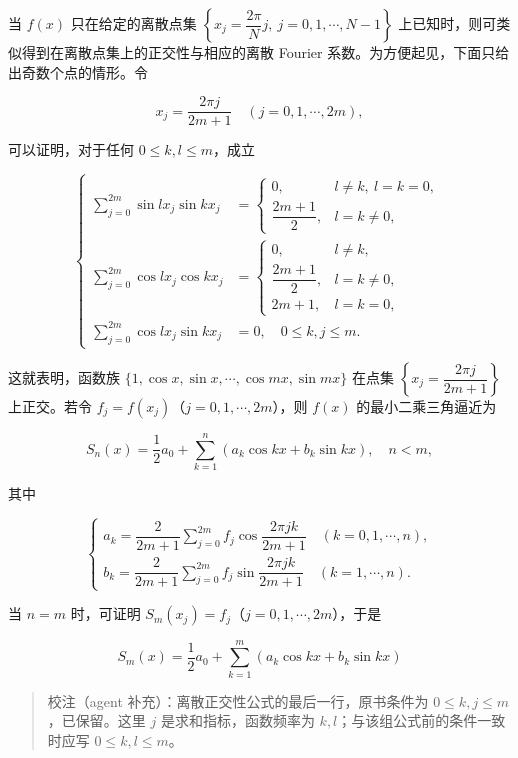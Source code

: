 \documentclass[
  10pt,
  fontset=fandol]{ctexart}
\begin{document}
当 \(f(x)\) 只在给定的离散点集 \(\left\{x_j=\dfrac{2\pi}{N}j,\ j=0,1,\cdots,N-1\right\}\) 上已知时，则可类似得到在离散点集上的正交性与相应的离散 Fourier 系数。为方便起见，下面只给出奇数个点的情形。令

\[
x_j=\frac{2\pi j}{2m+1}\quad(j=0,1,\cdots,2m),
\]

可以证明，对于任何 \(0\leqslant k,l\leqslant m\)，成立

\[
\left\{\begin{aligned}
\sum_{j=0}^{2m}\sin lx_j\sin kx_j&=\begin{cases}
0,&l\ne k,\ l=k=0,\\
\dfrac{2m+1}{2},&l=k\ne0,
\end{cases}\\[4pt]
\sum_{j=0}^{2m}\cos lx_j\cos kx_j&=\begin{cases}
0,&l\ne k,\\
\dfrac{2m+1}{2},&l=k\ne0,\\
2m+1,&l=k=0,
\end{cases}\\[4pt]
\sum_{j=0}^{2m}\cos lx_j\sin kx_j&=0,\quad0\leqslant k,j\leqslant m.
\end{aligned}\right.
\]

这就表明，函数族 \(\{1,\allowbreak \cos x,\allowbreak \sin x,\allowbreak \cdots,\allowbreak \cos mx,\allowbreak \sin mx\}\) 在点集 \(\left\{x_j=\dfrac{2\pi j}{2m+1}\right\}\) 上正交。若令 \(f_j=f(x_j)\)（\(j=0,1,\cdots,2m\)），则 \(f(x)\) 的最小二乘三角逼近为

\[
S_n(x)=\frac12a_0+\sum_{k=1}^n(a_k\cos kx+b_k\sin kx),\quad n<m,
\]

其中

\[
\begin{cases}
a_k=\dfrac2{2m+1}\displaystyle\sum_{j=0}^{2m}f_j\cos\dfrac{2\pi jk}{2m+1}\quad(k=0,1,\cdots,n),\\[4pt]
b_k=\dfrac2{2m+1}\displaystyle\sum_{j=0}^{2m}f_j\sin\dfrac{2\pi jk}{2m+1}\quad(k=1,\cdots,n).
\end{cases}\tag{3.7.4}
\]

当 \(n=m\) 时，可证明 \(S_m(x_j)=f_j\)（\(j=0,1,\cdots,2m\)），于是

\[
S_m(x)=\frac12a_0+\sum_{k=1}^m(a_k\cos kx+b_k\sin kx)
\]

\begin{quote}
校注（agent 补充）：离散正交性公式的最后一行，原书条件为 \(0\leqslant k,j\leqslant m\)，已保留。这里 \(j\) 是求和指标，函数频率为 \(k,l\)；与该组公式前的条件一致时应写 \(0\leqslant k,l\leqslant m\)。
\end{quote}
\end{document}
